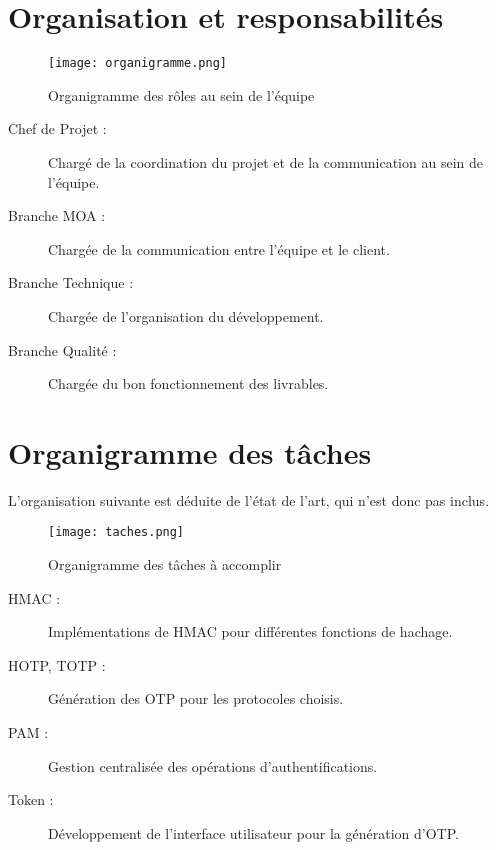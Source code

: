 \documentclass{../../res/univ-projet}
\begin{document}
\newpage
\section{Organisation et responsabilités}
	\begin{figure}[h]
		\texttt{[image: organigramme.png]}
		\caption{Organigramme des rôles au sein de l'équipe}
	\end{figure}
	
	\begin{description}
		\item[Chef de Projet :] Chargé de la coordination du projet et de la communication au sein de l'équipe.
		\item[Branche MOA :] Chargée de la communication entre l'équipe et le client.
		\item[Branche Technique :] Chargée de l'organisation du développement.
		\item[Branche Qualité :] Chargée du bon fonctionnement des livrables. 
	\end{description}
	
\newpage
\section{Organigramme des t\^aches}
	L'organisation suivante est déduite de l'état de l'art, qui n'est donc pas inclus.
	\begin{figure}[h]
		\texttt{[image: taches.png]}
		\caption{Organigramme des tâches à accomplir}
	\end{figure}
	
	\begin{description}
		\item[HMAC :] Implémentations de HMAC pour différentes fonctions de hachage.
		\item[HOTP, TOTP :] Génération des OTP pour les protocoles choisis.
		\item[PAM :] Gestion centralisée des opérations d'authentifications.
		\item[Token :] Développement de l'interface utilisateur pour la génération d'OTP.
	\end{description}
	
\newpage
\end{document}
